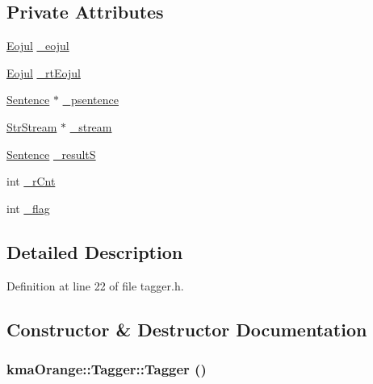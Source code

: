 \subsection*{Private Attributes}
\begin{CompactItemize}
\item 
\hyperlink{classkmaOrange_1_1Eojul}{Eojul} \hyperlink{classkmaOrange_1_1Tagger_53a6531fff482ea3378a68890d8d7ecf}{\_\-eojul}
\item 
\hyperlink{classkmaOrange_1_1Eojul}{Eojul} \hyperlink{classkmaOrange_1_1Tagger_7ecadcf482481e16714b42216cb0eaad}{\_\-rtEojul}
\item 
\hyperlink{classSentence}{Sentence} $\ast$ \hyperlink{classkmaOrange_1_1Tagger_aea88aa4cfbe20663a74de573b5c5631}{\_\-psentence}
\item 
\hyperlink{classkmaOrange_1_1StrStream}{StrStream} $\ast$ \hyperlink{classkmaOrange_1_1Tagger_0f94379d43beb1ea9e742e313a19d26d}{\_\-stream}
\item 
\hyperlink{classSentence}{Sentence} \hyperlink{classkmaOrange_1_1Tagger_0772dae32ba7bbd31122e4bfe0967b0b}{\_\-resultS}
\item 
int \hyperlink{classkmaOrange_1_1Tagger_bb6d57b5e78be85d37b83f63dd5d29f9}{\_\-rCnt}
\item 
int \hyperlink{classkmaOrange_1_1Tagger_d6157a27601a393b3348d88ed6368a7b}{\_\-flag}
\end{CompactItemize}


\subsection{Detailed Description}


Definition at line 22 of file tagger.h.

\subsection{Constructor \& Destructor Documentation}
\hypertarget{classkmaOrange_1_1Tagger_85edb4126121261305a7b33c186e0358}{
\subsubsection[{Tagger}]{\setlength{\rightskip}{0pt plus 5cm}kmaOrange::Tagger::Tagger ()}}
\label{classkmaOrange_1_1Tagger_85edb4126121261305a7b33c186e0358}




